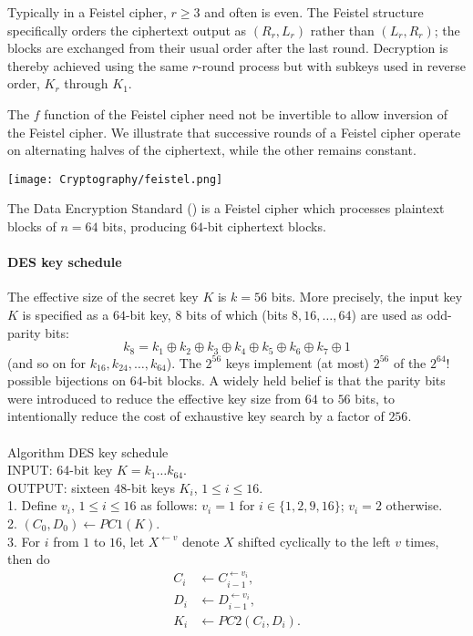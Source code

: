 \documentclass[a4paper, 11pt, openany]{book}
\begin{document}
Typically in a Feistel cipher, $r \ge 3$ and often is even. The Feistel structure specifically
orders the ciphertext output as $(R_r, L_r)$ rather than $(L_r,R_r)$; the blocks are exchanged
from their usual order after the last round. Decryption is thereby achieved using the same
$r$-round process but with subkeys used in reverse order, $K_r$ through $K_1$.

The $f$ function of the Feistel cipher need not be invertible to allow inversion of
the Feistel cipher. We illustrate that successive rounds of a Feistel cipher operate on alternating halves of the ciphertext, while the other remains constant.

\begin{center}
    \texttt{[image: Cryptography/feistel.png]}
\end{center}

The Data Encryption Standard () is a Feistel cipher which processes plaintext blocks of $n = 64$ bits, producing $64$-bit ciphertext blocks.

\paragraph{DES key schedule}
The effective size of the secret key $K$ is $k = 56$ bits. More precisely, the input key $K$ is specified as a $64$-bit key, $8$ bits of which (bits $8, 16, \dots, 64$) are used as odd-parity bits:
\[
    k_8 = k_1 \oplus k_2 \oplus k_3 \oplus k_4 \oplus k_5 \oplus k_6 \oplus k_7 \oplus 1
\]
(and so on for $k_{16}, k_{24}, \dots, k_{64}$). The $2^{56}$ keys implement (at most) $2^{56}$ of the $2^{64}!$ possible bijections on $64$-bit blocks. A widely held belief is that the parity bits were introduced to reduce the effective key size from $64$ to $56$ bits, to intentionally reduce the cost of exhaustive key search by a factor of $256$.\\
~\\
Algorithm DES key schedule\\
INPUT: 64-bit key $K = k_1 \dots k_{64}$.\\
OUTPUT: sixteen $48$-bit keys $K_i$, $1 \le i \le 16$.\\
1. Define $v_i$, $1 \le i \le 16$ as follows: $v_i = 1$ for $i \in \{1, 2, 9, 16\}$; $v_i = 2$ otherwise.\\
2. $(C_0,D_0) \gets PC1(K)$. \\
3. For $i$ from $1$ to $16$, let $X^{\gets v}$ denote $X$ shifted cyclically to the left $v$ times, then do
\begin{align*}
    C_i &\gets C_{i-1}^{\gets v_i},\\
    D_i &\gets D_{i-1}^{\gets v_i},\\
    K_i &\gets PC2(C_i,D_i).
\end{align*}
\end{document}
